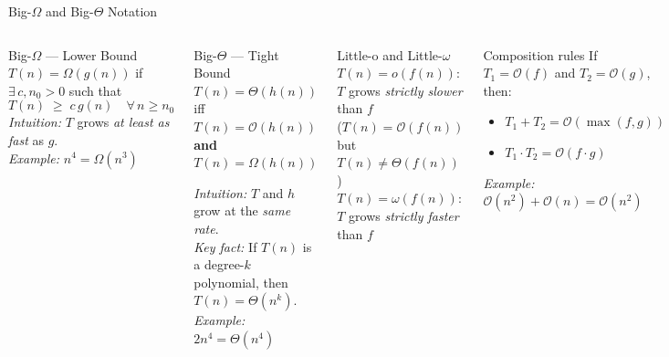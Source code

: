 \documentclass[aspectratio=169]{beamer}
\begin{document}
\begin{frame}[shrink=20]{Big-$\Omega$ and Big-$\Theta$ Notation}
  \begin{columns}[T]
      \begin{block}{Big-$\Omega$ — Lower Bound}
        $T(n) = \Omega(g(n))$ if $\exists\,c, n_0 > 0$ such that
        \[
          T(n) \;\geq\; c\,g(n) \quad \forall\, n \geq n_0
        \]
        \textit{Intuition:} $T$ grows \emph{at least as fast} as $g$.\\[0.3em]
        \textit{Example:} $n^4 = \Omega(n^3)$
      \end{block}
      \vspace{0.4em}
      \begin{block}{Big-$\Theta$ — Tight Bound}
        $T(n) = \Theta(h(n))$ iff
        $T(n) = \mathcal{O}(h(n))$ \textbf{and} $T(n) = \Omega(h(n))$
        \vspace{0.2em}

        \textit{Intuition:} $T$ and $h$ grow at the \emph{same rate}.\\[0.3em]
        \textit{Key fact:} If $T(n)$ is a degree-$k$ polynomial,
        then $T(n) = \Theta(n^k)$.\\[0.3em]
        \textit{Example:} $2n^4 = \Theta(n^4)$
      \end{block}
      \begin{block}{Little-o and Little-$\omega$}
        $T(n) = o(f(n))$: $T$ grows \emph{strictly slower} than $f$\\
        \quad ($T(n)=\mathcal{O}(f(n))$ but $T(n)\neq\Theta(f(n))$)\\[0.3em]
        $T(n) = \omega(f(n))$: $T$ grows \emph{strictly faster} than $f$
      \end{block}
      \vspace{0.4em}
      \begin{block}{Composition rules}
        If $T_1 = \mathcal{O}(f)$ and $T_2 = \mathcal{O}(g)$, then:
        \begin{itemize}
          \item $T_1 + T_2 = \mathcal{O}(\max(f,g))$
          \item $T_1 \cdot T_2 = \mathcal{O}(f\cdot g)$
        \end{itemize}
        \textit{Example:} $\mathcal{O}(n^2)+\mathcal{O}(n)=\mathcal{O}(n^2)$
      \end{block}
  \end{columns}
\end{frame}
\end{document}
